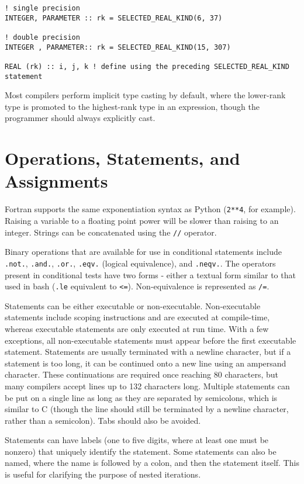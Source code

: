 \documentclass[10pt]{article}
\begin{document}
\begin{lstlisting}
! single precision
INTEGER, PARAMETER :: rk = SELECTED_REAL_KIND(6, 37)

! double precision
INTEGER , PARAMETER:: rk = SELECTED_REAL_KIND(15, 307)

REAL (rk) :: i, j, k ! define using the preceding SELECTED_REAL_KIND statement
\end{lstlisting}

Most compilers perform implicit type casting by default, where the lower-rank type is promoted to the highest-rank type in an expression, though the programmer should always explicitly cast.  

\section{Operations, Statements, and Assignments}
Fortran supports the same exponentiation syntax as Python ({\tt 2**4}, for example). Raising a variable to a floating point power will be slower than raising to an integer. Strings can be concatenated using the {\tt //} operator.

Binary operations that are available for use in conditional statements include {\tt .not.}, {\tt .and.}, {\tt .or.}, {\tt .eqv.} (logical equivalence), and {\tt .neqv.}. The operators present in conditional tests have two forms - either a textual form similar to that used in bash ({\tt .le} equivalent to {\tt <=}). Non-equivalence is represented as {\tt /=}. 

Statements can be either executable or non-executable. Non-executable statements include scoping instructions and are executed at compile-time, whereas executable statements are only executed at run time. With a few exceptions, all non-executable statements must appear before the first executable statement. Statements are usually terminated with a newline character, but if a statement is too long, it can be continued onto a new line using an ampersand character. These continuations are required once reaching 80 characters, but many compilers accept lines up to 132 characters long. Multiple statements can be put on a single line as long as they are separated by semicolons, which is similar to C (though the line should still be terminated by a newline character, rather than a semicolon). Tabs should also be avoided.

Statements can have labels (one to five digits, where at least one must be nonzero) that uniquely identify the statement. Some statements can also be named, where the name is followed by a colon, and then the statement itself. This is useful for clarifying the purpose of nested iterations.
\end{document}
